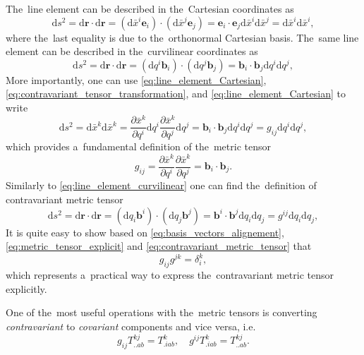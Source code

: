 \documentclass[preprint,12pt]{elsarticle}
\newcommand{\pdv}[2]{\frac{\partial{#1}}{\partial{#2}}}
\newcommand{\vect}[1]{\boldsymbol{#1}}
\newcommand{\dI}{\text{d}}
\begin{document}
The~line element can be described in the~Cartesian coordinates as
\begin{equation}
  \dI s^2 = \dI\vect{r}\cdot\dI\vect{r} = 
  (\dI \bar{x}^i \vect{e}_i)\cdot(\dI \bar{x}^j \vect{e}_j) = 
  \vect{e}_i\cdot\vect{e}_j \dI \bar{x}^i \dI \bar{x}^j 
  = \dI \bar{x}^i \dI \bar{x}^i ,
  \label{eq:line_element_Cartesian}
\end{equation}
where the~last equality is due to the~orthonormal Cartesian basis.
The~same line element can be described in the~curvilinear coordinates as
\begin{equation}
  \dI s^2 = \dI\vect{r}\cdot\dI\vect{r} = 
  (\dI q^i \vect{b}_i)\cdot(\dI q^j \vect{b}_j) = 
  \vect{b}_i\cdot\vect{b}_j \dI q^i \dI q^j ,
  \label{eq:line_element_curvilinear}
\end{equation}
More importantly, one can use \eqref{eq:line_element_Cartesian},
\eqref{eq:contravariant_tensor_transformation}, and 
\eqref{eq:line_element_Cartesian} to write
\begin{equation}
  \dI s^2 = \dI \bar{x}^k \dI \bar{x}^k = 
  \pdv{\bar{x}^k}{q^i} \dI q^{i} \pdv{\bar{x}^k}{q^j} \dI q^{j} 
  = \vect{b}_i\cdot\vect{b}_j \dI q^i \dI q^j 
  = g_{ij} \dI q^i \dI q^j ,
  \label{eq:metric_tensor}
\end{equation}
which provides a~fundamental definition of the~metric tensor
\begin{equation}
  g_{ij} = \pdv{\bar{x}^k}{q^i}\pdv{\bar{x}^k}{q^j} 
  = \vect{b}_i\cdot\vect{b}_j .
  \label{eq:metric_tensor_explicit}
\end{equation}
Similarly to \eqref{eq:line_element_curvilinear}
one can find the~definition of contravariant metric tensor
\begin{equation}
  \dI s^2 = \dI\vect{r}\cdot\dI\vect{r} = 
  (\dI q_i \vect{b}^i)\cdot(\dI q_j \vect{b}^j) = 
  \vect{b}^i\cdot\vect{b}^j \dI q_i \dI q_j 
  = g^{ij}\dI q_i \dI q_j ,
  \label{eq:contravariant_metric_tensor}
\end{equation}
It is quite easy to show 
based on \eqref{eq:basis_vectors_alignement}, 
\eqref{eq:metric_tensor_explicit} and \eqref{eq:contravariant_metric_tensor}
that
\begin{equation}
  g_{ij} g^{jk} = \delta_i^k ,
  \label{eq:contravariant_metric_tensor_explicit}
\end{equation}
which represents a~practical way to express the~contravariant metric tensor 
explicitly.

One of the~most useful operations with the~metric tensors is converting 
\textit{contravariant} to \textit{covariant} components and vice versa, i.e.
\begin{equation}
  g_{ij} T^{kj}_{..ab} = T^k_{.iab},\quad g^{ij} T^k_{.iab} = T^{kj}_{..ab} .
  \label{eq:contravariant2covariant}
\end{equation}
\end{document}
